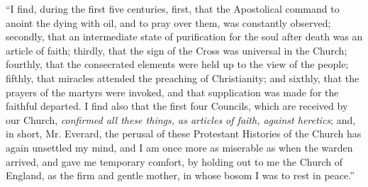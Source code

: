 ``I find, during the first five
centuries, first, that the Apostolical command to anoint the dying with
oil, and to pray over them, was constantly observed; secondly, that an
intermediate state of purification for the soul after death was an
article of faith; thirdly, that the sign of the Cross was universal in
the Church; fourthly, that the consecrated elements were held up to the
view of the people; fifthly, that miracles attended the preaching of
Christianity; and sixthly, that the prayers of the martyrs were invoked,
and that supplication was made for the faithful departed. I find also
that the first four Councils, which are received by our Church, \emph{confirmed
all these things, as articles of faith, against heretics}; and, in
short, Mr. Everard, the perusal of these Protestant Histories of the
Church has again unsettled my mind, and I am once more as miserable as
when the warden arrived, and gave me temporary comfort, by holding out
to me the Church of England, as the firm and gentle mother, in whose
bosom I was to rest in peace.''

